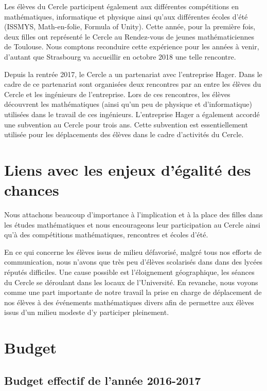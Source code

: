\documentclass[11pt,notitlepage]{article}
\begin{document}
 Les \'el\`eves du Cercle participent \'egalement 
 aux diff\'erentes comp\'etitions en math\'ematiques, informatique et physique ainsi qu'aux diff\'erentes \'ecoles d'\'et\'e (ISSMYS, Math-en-folie, Formula of Unity). 
 Cette ann\'ee, pour la premi\`ere fois, deux filles ont repr\'esent\'e le Cercle au Rendez-vous de jeunes math\'ematiciennes de Toulouse. Nous comptons reconduire cette exp\'erience
 pour les ann\'ees \`a venir, d'autant que Strasbourg va accueillir en octobre 2018 une telle rencontre.

Depuis la rentr\'ee 2017, le Cercle a un partenariat avec l'entreprise Hager. Dans le cadre de ce partenariat sont organis\'ees deux rencontres par an entre les \'el\`eves du Cercle et 
les ing\'enieurs de l'entreprise. Lors de ces rencontres, les \'el\`eves d\'ecouvrent les math\'ematiques (ainsi qu'un peu de physique et d'informatique) utilis\'ees dans le travail 
de ces ing\'enieurs. L'entreprise Hager a \'egalement accord\'e une subvention au Cercle pour trois ans. Cette subvention est essentiellement utilis\'ee pour les d\'eplacements des 
\'el\`eves dans le cadre d'activit\'es du Cercle.


\section{Liens avec les enjeux d'\'egalit\'e des chances }

Nous attachons beaucoup d'importance \`a l'implication et \`a la place des filles dans les \'etudes  math\'ematiques et nous encourageons leur participation au Cercle ainsi qu'\`a des comp\'etitions math\'ematiques, rencontres  et \'ecoles d'\'et\'e.

En ce qui concerne les \'el\`eves issus de milieu d\'efavoris\'e, malgr\'e tous nos efforts de communication, nous n'avons que tr\`es peu d'\'el\`eves scolaris\'es dans dans des lyc\'ees r\'eput\'es difficiles. Une cause possible est l'\'eloignement g\'eographique, les s\'eances du Cercle se d\'eroulant dans les locaux de l'Universit\'e. En revanche, nous voyons comme une part importante de notre travail la prise en charge de d\'eplacement de nos \'el\`eves \`a des \'ev\'enements math\'ematiques divers afin de permettre aux \'el\`eves issus d'un milieu modeste d'y participer pleinement. 

\section{Budget}

\subsection{Budget effectif de l'ann\'ee 2016-2017}
\end{document}
